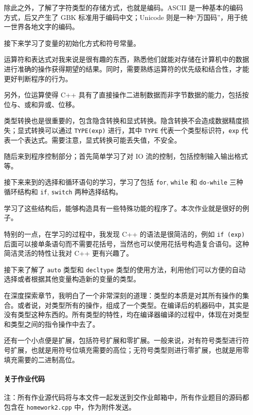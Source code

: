 \documentclass[12pt,a4paper,UTF8]{ctexart} %
\begin{document}
    除此之外，了解了字符类型的存储方式，也就是编码。ASCII 是一种基本的编码方式，后又产生了 GBK 标准用于编码中文；Unicode 则是一种“万国码”，用于统一世界各地文字的编码。\par
    
    接下来学习了变量的初始化方式和符号常量。\par
    
    运算符和表达式对我来说是很有趣的东西，熟悉他们就能对存储在计算机中的数据进行准确的操作获得期望的结果。同时，需要熟练运算符的优先级和结合性，才能更好判断程序的行为。\par
    
    另外，位运算使得 C++ 具有了直接操作二进制数据而非字节数据的能力，包括按位与、或和异或、位移。\par
    
    类型转换也是很重要的，包含隐含转换和显式转换。隐含转换不会造成数据精度损失；显式转换可以通过 \texttt{TYPE(exp)} 进行，其中 \texttt{TYPE} 代表一个类型标识符，\texttt{exp} 代表一个表达式。需要注意，显式转换可能丢失值，不安全。\par
    
    随后来到程序控制部分；首先简单学习了对 IO 流的控制，包括控制输入输出格式等。\par
    
    接下来来到的选择和循环语句的学习，学习了包括 \texttt{for}, \texttt{while} 和 \texttt{do-while} 三种循环结构和 \texttt{if}, \texttt{switch} 两种选择结构。\par
    
    学习了这些结构后，能够构造具有一些特殊功能的程序了。本次作业就是很好的例子。\par
    
    特别的一点，在学习的过程中，我发现 C++ 的语法是很简洁的，例如 \texttt{if (exp) } 后面可以接单条语句而不需要花括号，当然也可以使用花括号构造复合语句。这种简洁灵活的特性让我对 C++ 更有兴趣了。\par
    
    接下来了解了 \texttt{auto} 类型和 \texttt{decltype} 类型的使用方法，利用他们可以方便的自动选择或者根据其他变量构造新的变量的类型。\par
    
    在深度探索章节，我明白了一个非常深刻的道理：类型的本质是对其所有操作的集合。或者说，对类型所有的操作，组成了一个类型。在编译后的机器码中，其实是没有类型这种东西的。所有类型的特性，均在编译器编译的过程中，体现在对类型和类型之间的指令操作中去了。\par
    
    还有一个小点便是扩展，包括符号扩展和零扩展。一般来说，对有符号类型进行符号扩展，也就是用符号位填充需要的高位；无符号类型则进行零扩展，也就是用零填充需要的二进制高位。\par
    
    
    \paragraph{关于作业代码}
    注：所有作业源代码将与本文件一起发送到交作业邮箱中，所有作业题目的源码都包含在 \texttt{homework2.cpp} 中，作为附件发送。 
    
\end{document}
